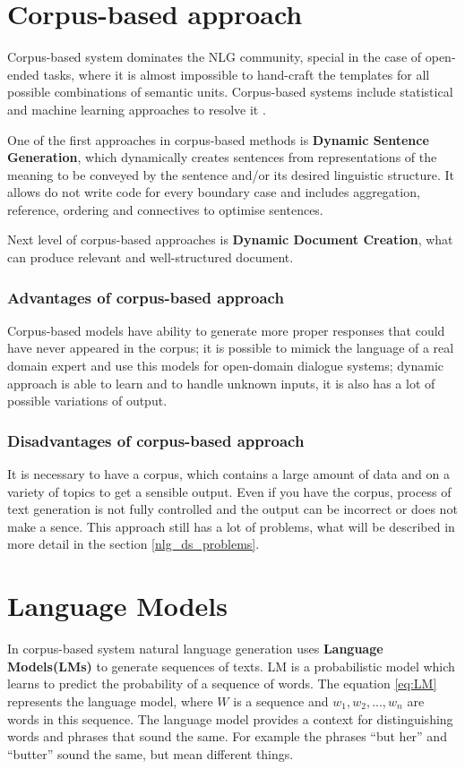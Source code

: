 \section{Corpus-based approach}
Corpus-based system dominates the NLG community, special in the case of open-ended tasks, where it is almost impossible to hand-craft the templates for all possible combinations of semantic units. Corpus-based systems include statistical and machine learning approaches to resolve it \cite{rudnicky2002dialog}.

One of the first approaches in corpus-based methods is \textbf{Dynamic Sentence Generation}, which dynamically creates sentences from representations of the meaning to be conveyed by the sentence and/or its desired linguistic structure. It allows do not write code for every boundary case and includes aggregation, reference, ordering and connectives to optimise sentences.

Next level of corpus-based approaches is \textbf{Dynamic Document Creation}, what can produce relevant and well-structured document. 

\subsubsection{Advantages of corpus-based approach}
Corpus-based models have ability to generate more proper responses that could have never appeared in the corpus; it is possible to mimick the language of a real domain expert and use this models for open-domain dialogue systems; dynamic approach is able to learn and to handle unknown inputs, it is also has a lot of possible variations of output.

\subsubsection{Disadvantages of corpus-based approach}
It is necessary to have a corpus, which contains a large amount of data and on a variety of topics to get a sensible output. Even if you have the corpus, process of text generation is not fully controlled and the output can be incorrect or does not make a sence. This approach still has a lot of problems, what will be described in more detail in the section \ref{nlg_ds_problems}. 

\section{Language Models}
In corpus-based system natural language generation uses \textbf{Language Models(LMs)} to generate sequences of texts. LM is a probabilistic model which learns to predict the probability of a sequence of words. The equation \ref{eq:LM} represents the language model, where $W$ is a sequence and $w_1, w_2, ..., w_n$ are words in this sequence. The language model provides a context for distinguishing words and phrases that sound the same. For example the phrases ``but her'' and  ``butter'' sound the same, but mean different things.

